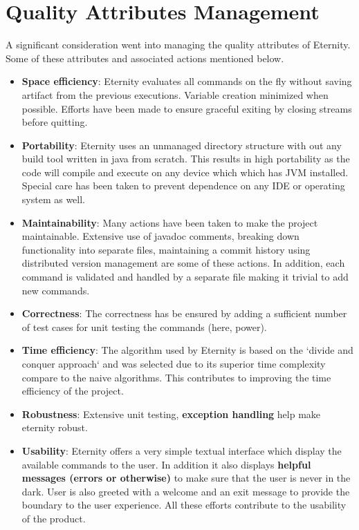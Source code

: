 \documentclass[11pt,a4paper]{report}
\theoremstyle{definition}
\theoremstyle{remark}
\begin{document}
        \section{Quality Attributes Management}
        A significant consideration went into managing the quality attributes of Eternity. Some of these attributes and associated actions mentioned below.
            \begin{itemize}
                \item \textbf{Space efficiency}: Eternity evaluates all commands on the fly without saving artifact from the previous executions. Variable creation minimized when possible. Efforts have been made to ensure graceful exiting by closing streams before quitting.
                
                \item \textbf{Portability}: Eternity uses an unmanaged directory structure with out any build tool written in java from scratch. This results in high portability as the code will compile and execute on any device which which has JVM installed. Special care has been taken to prevent dependence on any IDE or operating system as well.
                
                \item \textbf{Maintainability}: Many actions have been taken to make the project maintainable. Extensive use of javadoc comments, breaking down functionality into separate files, maintaining a commit history using distributed version management are some of these actions. In addition, each command is validated and handled by a separate file making it trivial to add new commands.
                
                \item \textbf{Correctness}: The correctness has be ensured by adding a sufficient number of test cases for unit testing the commands (here, power). 
                
                \item \textbf{Time efficiency}: The algorithm used by Eternity is based on the `divide and conquer approach` and was selected due to its superior time complexity compare to the naive algorithms. This contributes to improving the time efficiency of the project.
                
                \item \textbf{Robustness}: Extensive unit testing, \textbf{exception handling} help make eternity robust.
                
                \item \textbf{Usability}: Eternity offers a very simple textual interface which display the available commands to the user. In addition it also displays \textbf{helpful messages (errors or otherwise)} to make sure that the user is never in the dark. User is also greeted with a welcome and an exit message to provide the boundary to the user experience. All these efforts contribute to the usability of the product.

            \end{itemize}
    
\end{document}
